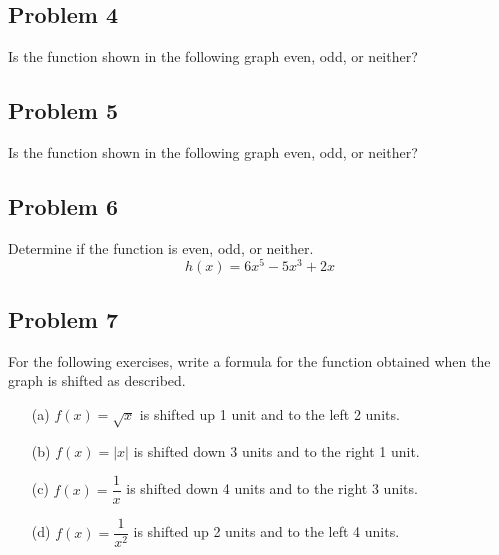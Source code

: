 \documentclass[12pt]{article}
\begin{document}
\subsection*{Problem 4}
Is the function shown in the following graph even, odd, or neither?
    \begin{center}
    \end{center}

\newpage
\subsection*{Problem 5}
Is the function shown in the following graph even, odd, or neither?
    \begin{center}
    \end{center}
    
\subsection*{Problem 6}
Determine if the function is even, odd, or neither.
\[h(x)=6x^5-5x^3+2x\]

\subsection*{Problem 7}
For the following exercises, write a formula for the function obtained when the graph is shifted as described.
\begin{enumerate}
    \item[(a)] \( f(x) = \sqrt{x} \) is shifted up 1 unit and to the left 2 units.
    
    \item[(b)] \( f(x) = |x| \) is shifted down 3 units and to the right 1 unit.
    
    \item[(c)] \( f(x) = \dfrac{1}{x} \) is shifted down 4 units and to the right 3 units.
    
    \item[(d)] \( f(x) = \dfrac{1}{x^2} \) is shifted up 2 units and to the left 4 units.
\end{enumerate}
\end{document}

